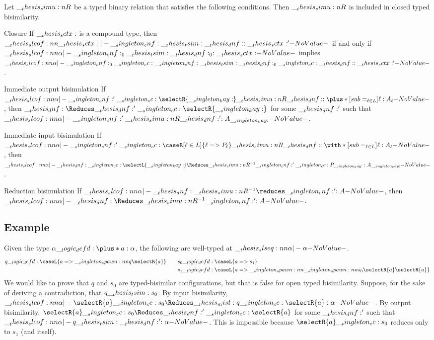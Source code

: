 \begin{conjecture}
  Let $\__thesis_simu:n {R}$ be a typed binary relation that satisfies the following conditions.
  Then $\__thesis_simu:n {R}$ is included in closed typed bisimilarity.
  \begin{thmdescription}
  \item[Closure]
    If $\__thesis_sctx:$ is a compound type, then $\slcof{\sctx |- \cnf \tsim \dnf : \sctx'}$ if and only if $\slcof{\alpha |- \cnf_0 \tsim \dnf_0 : \sctx}$ implies $\slcof{\alpha |- \cnf_0 \cc \cnf \tsim \dnf_0 \cc \dnf : \sctx'}$.
  \item[Immediate output bisimulation]
    If $\slcof{\alpha |- \cnf' \cc \selectR{\kay} \simu{R} \dnf : \plus*[sub=_{\ell \in L}]{\ell:A_{\ell}}}$, then $\dnf \Reduces \dnf' \cc \selectR{\kay}$ for some $\__thesis_dnf:'$ such that $\slcof{\alpha |- \cnf' \simu{R} \dnf' : A_{\kay}}$.
  \item[Immediate input bisimulation]
    If $\slcof{\alpha |- \cnf' \cc \caseR[\ell \in L]{\ell => P_{\ell}} \simu{R} \dnf : \with*[sub=_{\ell \in L}]{\ell:A_{\ell}}}$, then $\slcof{\alpha |- \dnf \cc \selectL{\kay} \Reduces\simu{R}^{-1} \cnf' \cc P_{\kay} : A_{\kay}}$.
  \item[Reduction bisimulation]
    If $\slcof{\alpha |- \dnf \simu{R}^{-1}\reduces \cnf' : A}$, then $\slcof{\alpha |- \dnf \Reduces\simu{R}^{-1} \cnf' : A}$.
  \end{thmdescription}
\end{conjecture}


\subsection{Example}

Given the type $\alpha \defd \plus*{a:\alpha}$, the following are well-typed at $\slseq{\alpha |- \alpha}$.
\begin{equation*}
  q \defd \caseL{a => \spawn{q}{\selectR{a}}}
  \qquad
  \begin{lgathered}[t]
    s_0 \defd \caseL{a => s_1} \\
    s_1 \defd \caseL{a => \spawn{\spawn{s_0}{\selectR{a}}}{\selectR{a}}}
  \end{lgathered}
\end{equation*}
We would like to prove that $q$ and $s_0$ are typed-bisimilar configurations, but that is false for open typed bisimilarity.
Suppose, for the sake of deriving a contradiction, that $q \__thesis_tsim: s_0$.
By input bisimilarity, $\slcof{\alpha |- \selectR{a} \cc s_0 \Reduces\mist q \cc \selectR{a} : \alpha}$.
By output bisimilarity, $\selectR{a} \cc s_0 \Reduces \dnf' \cc \selectR{a}$ for some $\__thesis_dnf:'$ such that $\slcof{\alpha |- q \tsim \dnf' : \alpha}$.
This is impossible because $\selectR{a} \cc s_0$ reduces only to $s_1$ (and itself).


